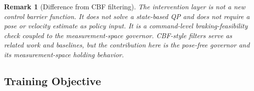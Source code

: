 \documentclass[11pt]{article}
\newtheorem{remark}{Remark}
\begin{document}
\begin{remark}[Difference from CBF filtering]
The intervention layer is not a new control barrier function. It does not solve
a state-based QP and does not require a pose or velocity estimate as policy
input. It is a command-level braking-feasibility check coupled to the
measurement-space governor. CBF-style filters serve as related work and
baselines, but the contribution here is the pose-free governor and its
measurement-space holding behavior.
\end{remark}

\subsection{Training Objective}
\label{sec:training_objective}
\end{document}
